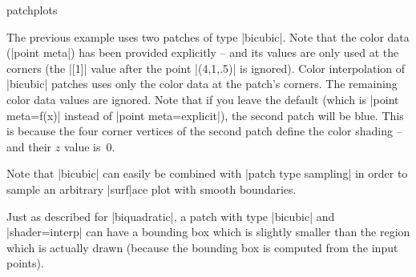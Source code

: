 {\begin{pgfplotslibrary}{patchplots}
\begin{codeexample}[]
\end{codeexample}
	The previous example uses two patches of type |bicubic|. Note that the color data (|point meta|) has been provided explicitly -- and its values are only used at the corners (the |[1]| value after the point |(4,1,.5)| is ignored). Color interpolation of |bicubic| patches uses only the color data at the patch's corners. The remaining color data values are ignored. Note that if you leave the default (which is |point meta=f(x)| instead of |point meta=explicit|), the second patch will be blue. This is because the four corner vertices of the second patch define the color shading -- and their $z$ value is~$0$.

	Note that |bicubic| can easily be combined with |patch type sampling| in order to sample an arbitrary |surf|ace plot with smooth boundaries.

	Just as described for |biquadratic|, a patch with type |bicubic| and |shader=interp| can have a bounding box which is slightly smaller than the region which is actually drawn (because the bounding box is computed from the input points).


\end{pgfplotslibrary}}
